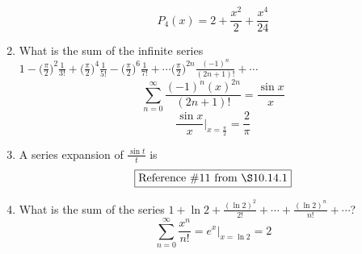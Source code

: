 \documentclass[12pt]{article}
\begin{document}
\begin{enumerate}
		$$\boxed{P_{4}(x) = 2+ \frac{x^2}{2} + \frac{x^4}{24}}$$
	\item What is the sum of the infinite series $1- \big(\frac{\pi}{2}\big)^2 \frac{1}{3!} + \big(\frac{\pi}{2}\big)^4\frac{1}{5!} - \big(\frac{\pi}{2}\big)^6 \frac{1}{7!} + \cdots \big(\frac{\pi}{2}\big)^{2n} \frac{(-1)^n}{(2n+1)!} + \cdots$
	$$\sum_{n=0}^{\infty} \frac{(-1)^{n}(x)^{2n}}{(2n+1)!} = \frac{\sin x}{x}$$
	$$\frac{\sin x}{x} \biggr\rvert_{x= \frac{\pi}{2}} = \boxed{\frac{2}{\pi}}$$
	\item A series expansion of $\frac{\sin t}{t}$ is
	$$\boxed{\text{Reference } \# 11 \text{ from } \S 10.14.1}$$
	\item What is the sum of the series $1+\ln 2 + \frac{(\ln 2)^2}{2!} + \cdots + \frac{(\ln 2)^n}{n!} + \cdots$?
	$$\sum_{n=0}^{\infty} \frac{x^{n}}{n!} = e^{x} \biggr\rvert_{x= \ln 2} = \boxed{2}$$
\end{enumerate}
\end{document}

